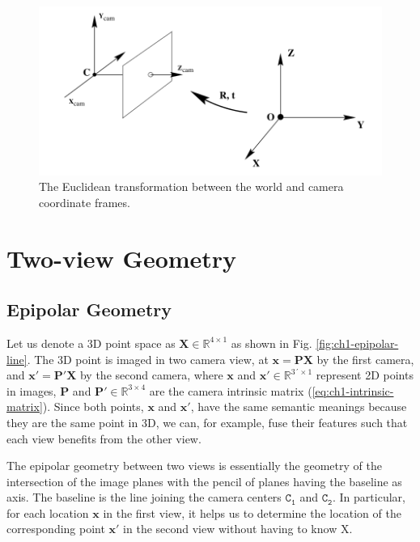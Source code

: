 \begin{figure}[htpb]
	\centering
	\includegraphics[width=0.7\columnwidth]{figures/ch1/world-to-camera-coordinate.png}
	\caption{The Euclidean transformation between the world and camera coordinate frames.}
	\label{fig:ch1-world-to-camera-coordinate}
\end{figure}
\section{Two-view Geometry}
\subsection{Epipolar Geometry}
Let us denote a 3D point space as  $\mathbf{X} \in \mathbb{R}^{4 \times 1}$ as shown in Fig. \ref{fig:ch1-epipolar-line}. The 3D point is imaged in two camera view, at $\mathbf{x = PX}$ by the first camera, and $\mathbf{x' = P'X}$ by the second camera, where $\mathbf{x}$ and $\mathbf{x'} \in \mathbb{R}^{3´ \times 1}$ represent 2D points in images, $\mathbf{P}$ and $\mathbf{P'} \in \mathbb{R}^{3 \times 4}$ are the camera intrinsic matrix (\ref{eq:ch1-intrinsic-matrix}). Since both points, $\mathbf{x}$ and $\mathbf{x'}$, have the same semantic meanings because they are the same point in 3D, we can, for example, fuse their features  such that each view benefits from the other view.

The epipolar geometry \cite{book:multivew-geometry} between two views is essentially the geometry of the intersection of the image planes with the pencil of planes having the baseline as axis. The baseline is the line joining the camera centers $\mathtt{C_1}$ and $\mathtt{C_2}$. In particular, for each location $\mathbf{x}$ in the first view, it helps us to determine the location of the corresponding point $\mathbf{x'}$ in the second view without having to know X.


